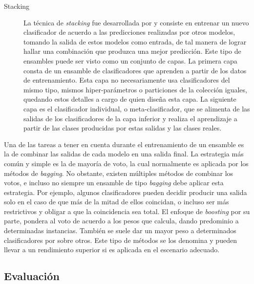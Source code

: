 \begin{description}
   \item[Stacking] La técnica de \textit{stacking} fue desarrollada por
      \citeauthor{wolpert_stacked_1992}\cite{wolpert_stacked_1992} y consiste en
      entrenar un nuevo clasificador de acuerdo a las predicciones realizadas
      por otros modelos, tomando la salida de estos modelos como entrada, de tal
      manera de lograr hallar una combinación que produzca una mejor predicción.
      Este tipo de ensambles puede ser visto como un conjunto de capas. La
      primera capa consta de un ensamble de clasificadores que aprenden a partir
      de los datos de entrenamiento. Esta capa no necesariamente usa
      clasificadores del mismo tipo, mismos hiper-parámetros o particiones de la
      colección iguales, quedando estos detalles a cargo de quien diseña esta
      capa. La siguiente capa es el clasificador individual, o
      meta-clasificador, que se alimenta de las salidas de los clasificadores de
      la capa inferior y realiza el aprendizaje a partir de las clases
      producidas por estas salidas y las clases reales.

\end{description}

Una de las tareas a tener en cuenta durante el entrenamiento de un ensamble es
la de combinar las salidas de cada modelo en una salida final. La estrategia más
común y simple es la de mayoría de voto, la cual normalmente es aplicada por los
métodos de \textit{bagging}. No obstante, existen múltiples métodos de combinar
los votos, e incluso no siempre un ensamble de tipo \textit{bagging} debe
aplicar esta estrategia. Por ejemplo, algunos clasificadores pueden decidir
producir una salida solo en el caso de que más de la mitad de ellos coincidan, o
incluso ser más restrictivos y obligar a que la coincidencia sea total. El
enfoque de \textit{boosting} por su parte, pondera al voto de acuerdo a los
pesos que calcula, dando predominio a determinadas instancias.  También se suele
dar un mayor peso a determinados clasificadores por sobre otros. Este tipo de
métodos se los denomina  y pueden llevar a
un rendimiento superior si es aplicada en el escenario adecuado.



\subsection{Evaluación}
\label{evaluacion_intro}

